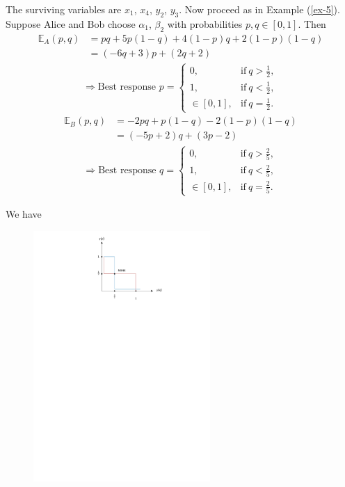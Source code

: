 The surviving variables are $x_1$, $x_4$, $y_2$, $y_3$. Now proceed as in Example (\ref{ex-5}). Suppose Alice and Bob choose $\alpha_1$, $\beta_2$ with probabilities $p, q\in[0, 1]$. Then
\begin{align*}
    \mathbb{E}_A(p, q) &= pq + 5p(1-q) + 4(1-p)q + 2(1-p)(1-q) \\
    & = (-6q+3)p + (2q+2)
\end{align*}
\begin{align*}
    \Longrightarrow \text{Best response }p=\left\lbrace\begin{array}{ll}
        0,& \text{if} \ q>\frac{1}{2},  \\
        1,& \text{if} \ q<\frac{1}{2}, \\
        \in[0, 1],& \text{if} \ q = \frac{1}{2}. 
    \end{array} \right.
\end{align*}
\begin{align*}
    \mathbb{E}_B(p,q) &= -2pq + p(1-q) - 2(1-p)(1-q) \\
    & = (-5p+2)q + (3p-2)
\end{align*}
\begin{align*}
    \Longrightarrow \text{Best response }q=\left\lbrace\begin{array}{ll}
        0,& \text{if} \ q>\frac{2}{5},  \\
        1,& \text{if} \ q<\frac{2}{5}, \\
        \in[0, 1],& \text{if} \ q = \frac{2}{5}. 
    \end{array} \right.
\end{align*}

We have 
\begin{figure}[H]
    \centering
    \includegraphics[width = 0.6\textwidth, trim = {4cm, 21cm, 3cm, 0cm}, clip]{document/0416.pdf}
\end{figure}

